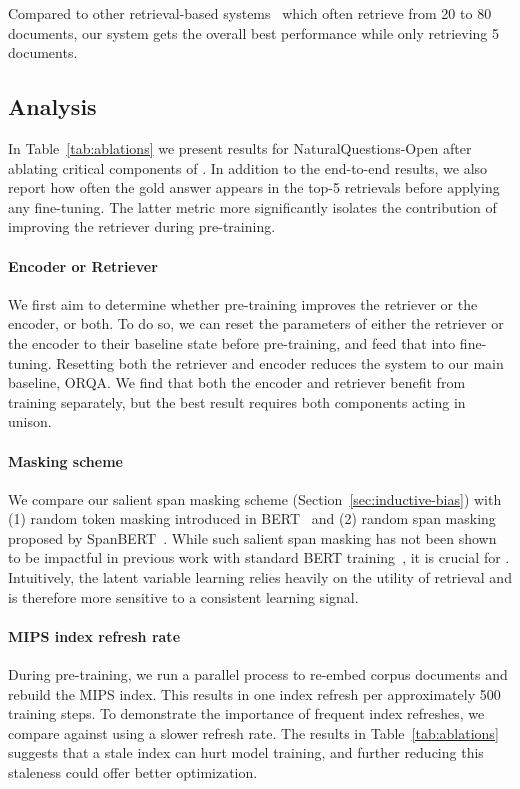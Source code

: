 Compared to other retrieval-based systems~\cite{rrp_salesforce,openqa_hardem,GraphRetriever} which often retrieve from 20 to 80 documents, our system gets the overall best performance while only retrieving 5 documents.


\subsection{Analysis}\label{sec:ablation}

In Table~\ref{tab:ablations} we present results for NaturalQuestions-Open after ablating critical components of \thename. In addition to the end-to-end results, we also report how often the gold answer appears in the top-5 retrievals before applying any fine-tuning. The latter metric more significantly isolates the contribution of improving the retriever during pre-training.

\paragraph{Encoder or Retriever}
We first aim to determine whether \thename pre-training improves the retriever or the encoder, or both. To do so, we can reset the parameters of either the retriever or the encoder to their baseline state before \thename pre-training, and feed that into fine-tuning. Resetting both the retriever and encoder reduces the system to our main baseline, ORQA. We find that both the encoder and retriever benefit from \thename training separately, but the best result requires both components acting in unison.

\paragraph{Masking scheme}
We compare our salient span masking scheme (Section~\ref{sec:inductive-bias})
with (1) random token masking introduced in BERT~\cite{bert}
and (2) random span masking proposed by SpanBERT~\cite{spanbert}. 
While such salient span masking has not been shown to be impactful in previous work with standard BERT training~\cite{spanbert}, it is crucial for \thename. Intuitively, the latent variable learning relies heavily on the utility of retrieval and is therefore more sensitive to a consistent learning signal.

\paragraph{MIPS index refresh rate}
During pre-training, we run a parallel process to re-embed corpus documents and rebuild the MIPS index.
This results in one index refresh per approximately 500 training steps.
To demonstrate the importance of frequent index refreshes,
we compare against using a slower refresh rate.
The results in Table~\ref{tab:ablations} suggests that a stale index can hurt model training, and further reducing this staleness could offer better optimization.

